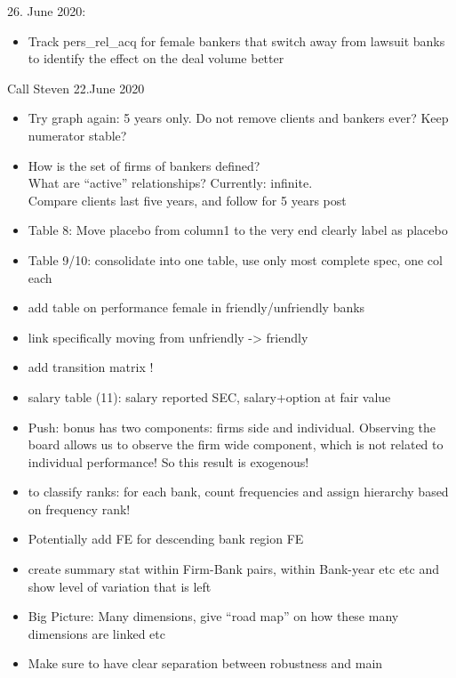 
26. June 2020:
\begin{itemize}
	\item Track pers\_rel\_acq for female bankers that switch away from lawsuit banks to identify the effect on the deal volume better 
\end{itemize}

Call Steven 22.June 2020
\begin{itemize}
	\item Try graph again: 5 years only. Do not remove clients and bankers ever? Keep numerator stable?

	\item  How is the set of firms of bankers defined? \\  What are “active” relationships? Currently: infinite. \\ Compare clients last five years, and follow for 5 years post

	\item Table 8: 	Move placebo from column1 to the very end clearly label as placebo

	\item Table 9/10: consolidate into one table, use only most complete spec, one col each

	\item add table on performance female in friendly/unfriendly banks
	\item link specifically moving from unfriendly -> friendly 
	\item add transition matrix !

	\item salary table (11): salary reported SEC, salary+option at fair value
	\item Push: bonus has two components: firms side and individual. Observing the board allows us to observe the firm wide component, which is not related to individual performance! So this result is exogenous!


	\item to classify ranks: for each bank, count frequencies and assign hierarchy based on frequency rank!

	\item Potentially add FE for descending bank region FE

\item create summary stat within Firm-Bank pairs, within Bank-year etc etc and show level of variation that is left


\item Big Picture: Many dimensions, give “road map” on how these many dimensions are linked etc
\item Make sure to have clear separation between robustness and main
\end{itemize}

